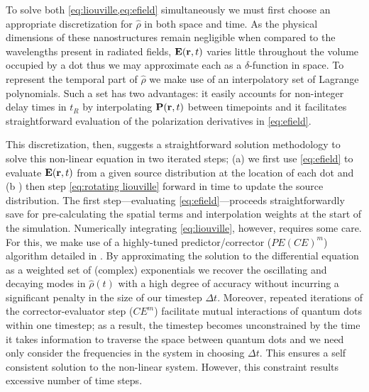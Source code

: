 \documentclass[conference]{IEEEtran}
\begin{document}
To solve both \cref{eq:liouville,eq:efield} simultaneously we must first choose an appropriate discretization for $\hat{\rho}$ in both space and time.
As the physical dimensions of these nanostructures remain negligible when compared to the wavelengths present in radiated fields, $\vb{E}(\vb{r}, t)$ varies little throughout the volume occupied by a dot thus we may approximate each as a $\delta$-function in space.
To represent the temporal part of $\hat{\rho}$ we make use of an interpolatory set of Lagrange polynomials.
Such a set has two advantages: it easily accounts for non-integer delay times in $t_R$ by interpolating $\vb{P}(\vb{r}, t)$ between timepoints and it facilitates straightforward evaluation of the polarization derivatives in \cref{eq:efield}.

This discretization, then, suggests a straightforward solution methodology to solve this non-linear equation in two iterated steps; (a) we first use \cref{eq:efield} to evaluate $\vb{E}(\vb{r}, t)$ from a given source distribution at the location of each dot and (b ) then step \cref{eq:rotating liouville} forward in time to update the source distribution.
The first step---evaluating \cref{eq:efield}---proceeds straightforwardly save for pre-calculating the spatial terms and interpolation weights at the start of the simulation.
Numerically integrating \cref{eq:liouville}, however, requires some care.
For this, we make use of a highly-tuned predictor/corrector ($PE(CE)^m$) algorithm detailed in \cite{Glaser2009}.
By approximating the solution to the differential equation as a weighted set of (complex) exponentials we recover the oscillating and decaying modes in $\hat{\rho}(t)$ with a high degree of accuracy without incurring a significant penalty in the size of our timestep $\Delta t$.
Moreover, repeated iterations of the corrector-evaluator step ($CE^m$) facilitate mutual interactions of quantum dots within one timestep; as a result, the timestep becomes unconstrained by the time it takes information to traverse the space between quantum dots and we need only consider the frequencies in the system in choosing $\Delta t$.
This ensures a self consistent solution to the non-linear system.
However, this constraint results excessive number of time steps.
\end{document}
